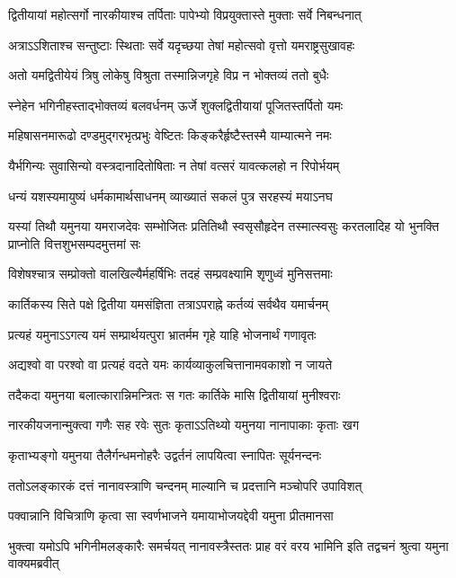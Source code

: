 \twolineshloka
{द्वितीयायां महोत्सर्गो नारकीयाश्च तर्पिताः}
{पापेभ्यो विप्रयुक्तास्ते मुक्ताः सर्वे निबन्धनात्} %

\twolineshloka
{अत्राऽऽशिताश्च सन्तुष्टाः स्थिताः सर्वे यदृच्छया}
{तेषां महोत्सवो वृत्तो यमराष्ट्रसुखावहः} %

\twolineshloka
{अतो यमद्वितीयेयं त्रिषु लोकेषु विश्रुता}
{तस्मान्निजगृहे विप्र न भोक्तव्यं ततो बुधैः} %

\twolineshloka
{स्नेहेन भगिनीहस्ताद्भोक्तव्यं बलवर्धनम्}
{ऊर्जे शुक्लद्वितीयायां पूजितस्तर्पितो यमः} %

\twolineshloka
{महिषासनमारूढो दण्डमुद्गरभृत्प्रभुः}
{वेष्टितः किङ्करैर्हृष्टैस्तस्मै याम्यात्मने नमः} %

\twolineshloka
{यैर्भगिन्यः सुवासिन्यो वस्त्रदानादितोषिताः}
{न तेषां वत्सरं यावत्कलहो न रिपोर्भयम्} %

\twolineshloka
{धन्यं यशस्यमायुष्यं धर्मकामार्थसाधनम्}
{व्याख्यातं सकलं पुत्र सरहस्यं मयाऽनघ} %

\fourlineindentedshloka
{यस्यां तिथौ यमुनया यमराजदेवः}
{सम्भोजितः प्रतितिथौ स्वसृसौहृदेन}
{तस्मात्स्वसुः करतलादिह यो भुनक्ति}
{प्राप्नोति वित्तशुभसम्पदमुत्तमां सः} %

\twolineshloka
{विशेषश्चात्र सम्प्रोक्तो वालखिल्यैर्महर्षिभिः}
{तदहं सम्प्रवक्ष्यामि शृणुध्वं मुनिसत्तमाः} %


\twolineshloka
{कार्तिकस्य सिते पक्षे द्वितीया यमसंज्ञिता}
{तत्राऽपराह्ने कर्तव्यं सर्वथैव यमार्चनम्} %

\twolineshloka
{प्रत्यहं यमुनाऽऽगत्य यमं सम्प्रार्थयत्पुरा}
{भ्रातर्मम गृहे याहि भोजनार्थं गणावृतः} %

\twolineshloka
{अद्यश्वो वा परश्वो वा प्रत्यहं वदते यमः}
{कार्यव्याकुलचित्तानामवकाशो न जायते} %

\twolineshloka
{तदैकदा यमुनया बलात्कारान्निमन्त्रितः}
{स गतः कार्तिके मासि द्वितीयायां मुनीश्वराः} %

\twolineshloka
{नारकीयजनान्मुक्त्वा गणैः सह रवेः सुतः}
{कृताऽऽतिथ्यो यमुनया नानापाकाः कृताः खग} %

\twolineshloka
{कृताभ्यङ्गो यमुनया तैलैर्गन्धमनोहरैः}
{उद्वर्तनं लापयित्वा स्नापितः सूर्यनन्दनः} %

\twolineshloka
{ततोऽलङ्कारकं दत्तं नानावस्त्राणि चन्दनम्}
{माल्यानि च प्रदत्तानि मञ्चोपरि उपाविशत्} %

\twolineshloka
{पक्वान्नानि विचित्राणि कृत्वा सा स्वर्णभाजने}
{यमायाभोजयद्देवी यमुना प्रीतमानसा} %

\threelineshloka
{भुक्त्वा यमोऽपि भगिनीमलङ्कारैः समर्चयत्}
{नानावस्त्रैस्ततः प्राह वरं वरय भामिनि}
{इति तद्वचनं श्रुत्वा यमुना वाक्यमब्रवीत्} %


